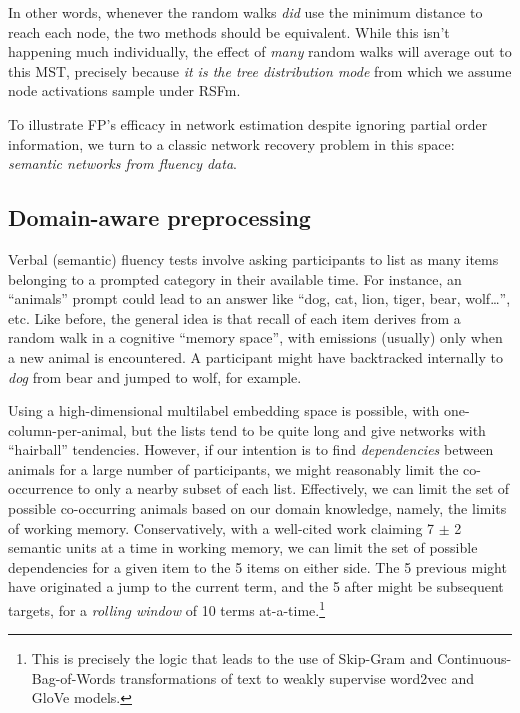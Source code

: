 \documentclass[%
	12pt,
		oneside,
		letterpaper
]{book}
\begin{document}
In other words, whenever the random walks \emph{did} use the minimum
distance to reach each node, the two methods should be equivalent. While
this isn't happening much individually, the effect of \emph{many} random
walks will average out to this MST, precisely because \emph{it is the
tree distribution mode} from which we assume node activations sample
under RSFm.

To illustrate FP's efficacy in network estimation despite ignoring
partial order information, we turn to a classic network recovery problem
in this space: \emph{semantic networks from fluency
data}\autocite{newdissimilaritymeasure_Prescott2006,Estimatingsemanticnetworks_Zemla2018}.

\subsection{Domain-aware
preprocessing}\label{domain-aware-preprocessing}

Verbal (semantic) fluency tests involve asking participants to list as
many items belonging to a prompted category in their available time. For
instance, an ``animals'' prompt could lead to an answer like ``dog, cat,
lion, tiger, bear, wolf\ldots{}'', etc. Like before, the general idea is
that recall of each item derives from a random walk in a cognitive
``memory space'', with emissions (usually) only when a new animal is
encountered. A participant might have backtracked internally to
\emph{dog} from bear and jumped to wolf, for example.

Using a high-dimensional multilabel embedding space is possible, with
one-column-per-animal, but the lists tend to be quite long and give
networks with ``hairball'' tendencies. However, if our intention is to
find \emph{dependencies} between animals for a large number of
participants, we might reasonably limit the co-occurrence to only a
nearby subset of each list. Effectively, we can limit the set of
possible co-occurring animals based on our domain knowledge, namely, the
limits of working memory. Conservatively, with a well-cited work
claiming 7 \(\pm\) 2 semantic units at a time in working
memory\autocite{magicalnumberseven_Miller1956}, we can limit the set of
possible dependencies for a given item to the 5 items on either side.
The 5 previous might have originated a jump to the current term, and the
5 after might be subsequent targets, for a \emph{rolling window} of 10
terms at-a-time.\footnote{ This is precisely the logic that leads to the
  use of Skip-Gram and Continuous-Bag-of-Words transformations of text
  to weakly supervise word2vec and GloVe
  models\autocite{GloveGlobalvectors_Pennington2014,Efficientestimationword_Mikolov2013}.}
\end{document}

